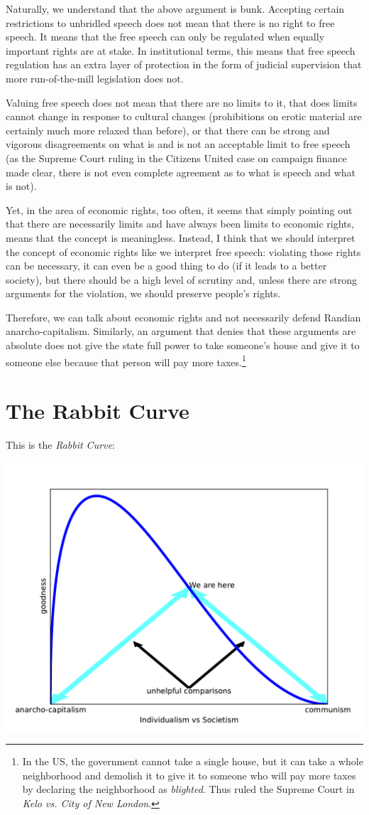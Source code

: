 Naturally, we understand that the above argument is bunk. Accepting certain
restrictions to unbridled speech does not mean that there is no right to free
speech. It means that the free speech can only be regulated when equally
important rights are at stake. In institutional terms, this means that free
speech regulation has an extra layer of protection in the form of judicial
supervision that more run-of-the-mill legislation does not.

Valuing free speech does not mean that there are no limits to it, that does
limits cannot change in response to cultural changes (prohibitions on erotic
material are certainly much more relaxed than before), or that there can be
strong and vigorous disagreements on what is and is not an acceptable limit to
free speech (as the Supreme Court ruling in the Citizens United case on
campaign finance made clear, there is not even complete agreement as to what is
speech and what is not).

Yet, in the area of economic rights, too often, it seems that simply pointing
out that there are necessarily limits and have always been limits to economic
rights, means that the concept is meaningless. Instead, I think that we should
interpret the concept of economic rights like we interpret free speech:
violating those rights can be necessary, it can even be a good thing to do (if
it leads to a better society), but there should be a high level of scrutiny
and, unless there are strong arguments for the violation, we should preserve
people's rights.

Therefore, we can talk about economic rights and not necessarily defend Randian
anarcho-capitalism. Similarly, an argument that denies that these arguments are
absolute does not give the state full power to take someone's house and give it
to someone else because that person will pay more taxes.\footnote{In the US,
the government cannot take a single house, but it can take a whole neighborhood
and demolish it to give it to someone who will pay more taxes by declaring the
neighborhood as \emph{blighted}. Thus ruled the Supreme Court in \emph{Kelo vs.
City of New London}.}

\section{The Rabbit Curve}

This is the \emph{Rabbit Curve}:

\includegraphics[width=.8\textwidth]{images/rabbit-curve.pdf}

